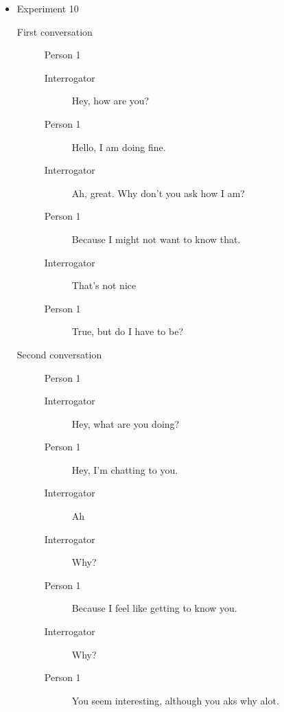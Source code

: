 \begin{itemize}
   \item Experiment 10
      \begin{description}
         \item [First conversation] Person 1
            \begin{description}
               \item [Interrogator] Hey, how are you?
               \item [Person 1] Hello, I am doing fine.
               \item [Interrogator] Ah, great. Why don't you ask how I am?
               \item [Person 1] Because I might not want to know that.
               \item [Interrogator] That's not nice
               \item [Person 1] True, but do I have to be?
            \end{description}
         \item [Second conversation] Person 1
            \begin{description}
               \item [Interrogator] Hey, what are you doing?
               \item [Person 1] Hey, I'm chatting to you.
               \item [Interrogator] Ah
               \item [Interrogator] Why?
               \item [Person 1] Because I feel like getting to know you.
               \item [Interrogator] Why?
               \item [Person 1] You seem interesting, although you aks why alot.
            \end{description}
      \end{description}


\end{itemize}
